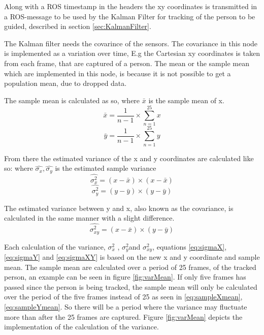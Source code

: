 Along with a ROS timestamp in the headers the xy coordinates is transmitted in a ROS-message to be used by the Kalman Filter for tracking of the person to be guided, described in section \ref{sec:KalmanFilter}.

The Kalman filter needs the covarince of the sensors. The covariance in this node is implemented as a variation over time, E.g the Cartesian xy coordinates is taken from each frame, that are captured of a person.
The mean or the sample mean which are implemented in this node, is because it is not possible to get a population mean, due to dropped data. 

The sample mean is calculated as so, where $\bar{x}$ is the sample mean of x.
\begin{equation}
    \bar{x} = \frac{1}{n-1} \times \sum_{n=1}^{25}x
    \label{eq:sampleXmean}
\end{equation}
\begin{equation}
    \bar{y} = \frac{1}{n-1} \times \sum_{n=1}^{25}y
    \label{eq:sampleYmean}
\end{equation}

From there the estimated variance of the x and y coordinates are calculated like so: where $\hat{\sigma_{x}}, \hat{\sigma_{y}}$ is the estimated sample variance
\begin{equation}
    \hat{\sigma^{2}_{x}} = (x - \bar{x}) \times (x - \bar{x})
    \label{eq:sigmaX}
\end{equation}
\begin{equation}
    \hat{\sigma^{2}_{y}} = (y - \bar{y}) \times (y - \bar{y})
    \label{eq:sigmaY}
\end{equation}

The estimated variance between y and x, also known as the covariance,
is calculated in the same manner with a slight difference.
\begin{equation}
    \hat{\sigma^{2}_{xy}} = (x - \bar{x}) \times (y - \bar{y})
    \label{eq:sigmaXY}
\end{equation}

Each calculation of the variance, $\sigma^{2}_{x}$ , $\sigma^{2}_{y}$and $\sigma^{2}_{xy}$, equations  \ref{eq:sigmaX},\ref{eq:sigmaY} and \ref{eq:sigmaXY} is based on the new x and y coordinate and sample mean.
The sample mean are calculated over a period of 25 frames, of the tracked person, an example can be seen in figure \ref{fig:varMean}. If only five frames has passed since the person is being tracked, the sample mean will only be calculated over the period of the five frames instead of 25 as seen in \ref{eq:sampleXmean}, \ref{eq:sampleYmean}. So there will be a period where the variance may fluctuate more than after the 25 frames are captured. Figure \ref{fig:varMean} depicts the implementation of the calculation of the variance.

